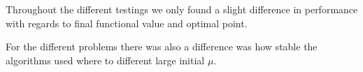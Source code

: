 Throughout the different testings we only found a slight difference in performance with regards to final functional value and optimal point.

For the different problems there was also a difference was how stable the algorithms used where to different large initial $\mu$.
